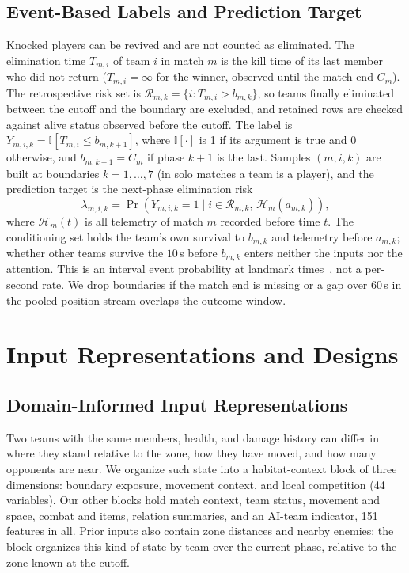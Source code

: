 \documentclass[sigconf,anonymous]{acmart}
\begin{document}
\subsection{Event-Based Labels and Prediction Target}
\label{sec:method:labels}
Knocked players can be revived and are not counted as eliminated. The elimination time $T_{m,i}$ of team $i$ in match $m$ is the kill time of its last member who did not return ($T_{m,i}=\infty$ for the winner, observed until the match end $C_m$). The retrospective risk set is $\mathcal{R}_{m,k}=\{i:T_{m,i}>b_{m,k}\}$, so teams finally eliminated between the cutoff and the boundary are excluded, and retained rows are checked against alive status observed before the cutoff. The label is $Y_{m,i,k}=\mathbb{I}[T_{m,i}\le b_{m,k+1}]$, where $\mathbb{I}[\cdot]$ is 1 if its argument is true and 0 otherwise, and $b_{m,k+1}=C_m$ if phase $k+1$ is the last. Samples $(m,i,k)$ are built at boundaries $k=1,\dots,7$ (in solo matches a team is a player), and the prediction target is the next-phase elimination risk
\begin{equation}
\lambda_{m,i,k}=\Pr\!\left(Y_{m,i,k}=1 \mid i\in\mathcal{R}_{m,k},\,\mathcal{H}_{m}(a_{m,k})\right),
\label{eq:hazard}
\end{equation}
where $\mathcal{H}_{m}(t)$ is all telemetry of match $m$ recorded before time $t$. The conditioning set holds the team's own survival to $b_{m,k}$ and telemetry before $a_{m,k}$; whether other teams survive the $10$\,s before $b_{m,k}$ enters neither the inputs nor the attention. This is an interval event probability at landmark times~\cite{vanHouwelingen07}, not a per-second rate. We drop boundaries if the match end is missing or a gap over 60\,s in the pooled position stream overlaps the outcome window.

\section{Input Representations and Designs}
\label{sec:method:design}
\subsection{Domain-Informed Input Representations}
\label{sec:method:representation}
Two teams with the same members, health, and damage history can differ in where they stand relative to the zone, how they have moved, and how many opponents are near. We organize such state into a habitat-context block of three dimensions: boundary exposure, movement context, and local competition (44 variables). Our other blocks hold match context, team status, movement and space, combat and items, relation summaries, and an AI-team indicator, 151 features in all. Prior inputs also contain zone distances and nearby enemies; the block organizes this kind of state by team over the current phase, relative to the zone known at the cutoff.
\end{document}
